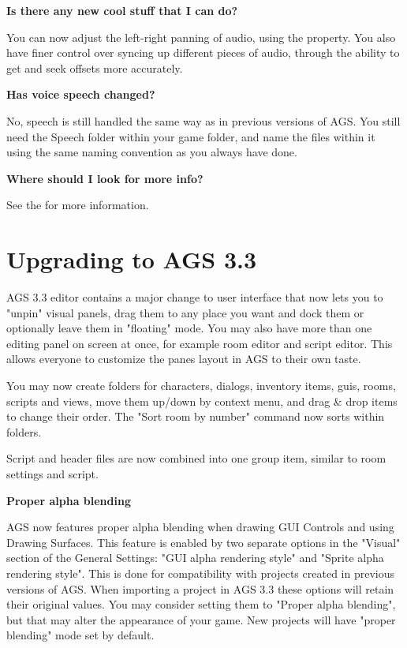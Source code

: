\bf{Is there any new cool stuff that I can do?}

You can now adjust the left-right panning of audio, using the 
property. You also have finer control over syncing up different pieces of audio, through the ability
to get and seek offsets more accurately.

\bf{Has voice speech changed?}

No, speech is still handled the same way as in previous versions of AGS. You still need
the Speech folder within your game folder, and name the files within it using the same
naming convention as you always have done.

\bf{Where should I look for more info?}

See the  for more information.


\chapter{Upgrading to AGS 3.3}\label{UpgradeTo33}%

AGS 3.3 editor contains a major change to user interface that now lets you to "unpin" visual panels,
drag them to any place you want and dock them or optionally leave them in "floating" mode. You may
also have more than one editing panel on screen at once, for example room editor and script editor.
This allows everyone to customize the panes layout in AGS to their own taste.

You may now create folders for characters, dialogs, inventory items, guis, rooms, scripts and views,
move them up/down by context menu, and drag & drop items to change their order.
The "Sort room by number" command now sorts within folders.

Script and header files are now combined into one group item, similar to room settings and script.

\bf{Proper alpha blending}

AGS now features proper alpha blending when drawing GUI Controls and using Drawing Surfaces.
This feature is enabled by two separate options in the "Visual" section of the General Settings:
"GUI alpha rendering style" and "Sprite alpha rendering style". This is done for compatibility with
projects created in previous versions of AGS.
When importing a project in AGS 3.3 these options will retain their original values. You may
consider setting them to "Proper alpha blending", but that may alter the appearance of your game.
New projects will have "proper blending" mode set by default.

